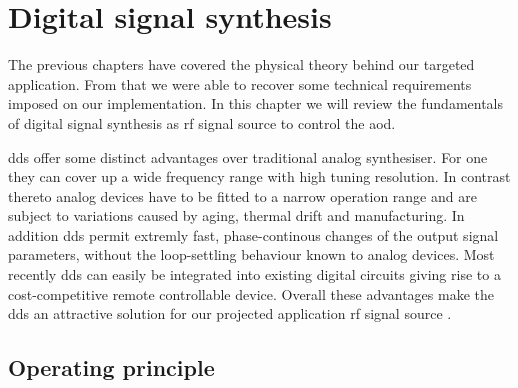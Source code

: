 \chapter{Digital signal synthesis}\label{ch:digital_signal_synthesis}

The previous chapters have covered the physical theory behind our targeted
application. From that we were able to recover some technical requirements
imposed on our implementation. In this chapter we will review the fundamentals
of digital signal synthesis as \gls{rf} signal source to control the \gls{aod}.

\gls{dds} offer some distinct advantages over traditional analog synthesiser.
For one they can cover up a wide frequency range with high tuning resolution.
In contrast thereto analog devices have to be fitted to a narrow operation
range and are subject to variations caused by aging, thermal drift and
manufacturing. In addition \gls{dds} permit extremly fast, phase-continous
changes of the output signal parameters, without the loop-settling behaviour
known to analog devices. Most recently \gls{dds} can easily be integrated into
existing digital circuits giving rise to a cost-competitive remote
controllable device. Overall these advantages make the \gls{dds} an attractive
solution for our projected application \gls{rf} signal source \cite{ADTutDDS}.

\section{Operating principle}

